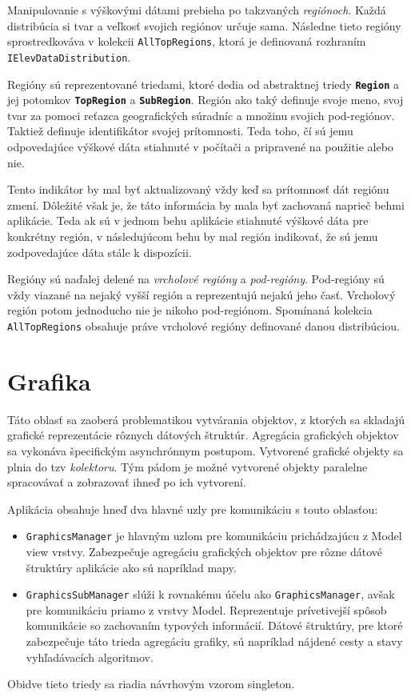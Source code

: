 Manipulovanie s výškovými dátami prebieha po takzvaných \textit{regiónoch}. Každá distribúcia si tvar a veľkosť svojich regiónov určuje sama. Následne tieto regióny sprostredkováva v kolekcii \texttt{AllTopRegions}, ktorá je definovaná rozhraním \texttt{IElevDataDistribution}.

Regióny sú reprezentované triedami, ktoré dedia od abstraktnej triedy \textbf{\texttt{Region}} a jej potomkov \textbf{\texttt{TopRegion}} a \textbf{\texttt{SubRegion}}. Región ako taký definuje svoje meno, svoj tvar za pomoci reťazca geografických súradníc a množinu svojich pod-regiónov. Taktiež definuje identifikátor svojej prítomnosti. Teda toho, čí sú jemu odpovedajúce výškové dáta stiahnuté v počítači a pripravené na použitie alebo nie.

Tento indikátor by mal byť aktualizovaný vždy keď sa prítomnosť dát regiónu zmení. Dôležité však je, že táto informácia by mala byť zachovaná naprieč behmi aplikácie. Teda ak sú v jednom behu aplikácie stiahnuté výškové dáta pre konkrétny región, v následujúcom behu by mal región indikovať, že sú jemu zodpovedajúce dáta stále k dispozícii.

Regióny sú naďalej delené na \textit{vrcholové regióny} a \textit{pod-regióny}. Pod-regióny sú vždy viazané na nejaký vyšší región a reprezentujú nejakú jeho časť. Vrcholový región potom jednoducho nie je nikoho pod-regiónom. Spomínaná kolekcia \texttt{AllTopRegions} obsahuje práve vrcholové regióny definované danou distribúciou.    

\section{Grafika}

Táto oblasť sa zaoberá problematikou vytvárania objektov, z ktorých sa skladajú grafické reprezentácie rôznych dátových štruktúr. Agregácia grafických objektov sa vykonáva špecifickým asynchrónnym postupom. Vytvorené grafické objekty sa plnia do tzv \textit{kolektoru}. Tým pádom je možné vytvorené objekty paralelne spracovávať a zobrazovať ihneď po ich vytvorení. 

Aplikácia obsahuje hneď dva hlavné uzly pre komunikáciu s touto oblasťou:
\begin{itemize}
    \item \texttt{GraphicsManager} je hlavným uzlom pre komunikáciu prichádzajúcu z Model view vrstvy. Zabezpečuje agregáciu grafických objektov pre rôzne dátové štruktúry aplikácie ako sú napríklad mapy.
    \item \texttt{GraphicsSubManager} slúži k rovnakému účelu ako \texttt{GraphicsManager}, avšak pre komunikáciu priamo z vrstvy Model. Reprezentuje prívetivejší spôsob komunikácie so zachovaním typových informácií. Dátové štruktúry, pre ktoré zabezpečuje táto trieda agregáciu grafiky, sú napríklad nájdené cesty a stavy vyhľadávacích algoritmov. 
\end{itemize}
Obidve tieto triedy sa riadia návrhovým vzorom singleton.

